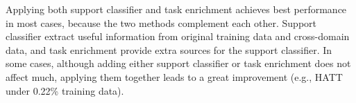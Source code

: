 Applying both support classifier and task enrichment achieves best performance in most cases, because the two methods complement each other. Support classifier extract useful information from original training data and cross-domain data, and task enrichment provide extra sources for the support classifier. %
In some cases, although adding either support classifier or task enrichment does not affect much, applying them together leads to a great improvement (e.g., HATT under 0.22\% training data).


